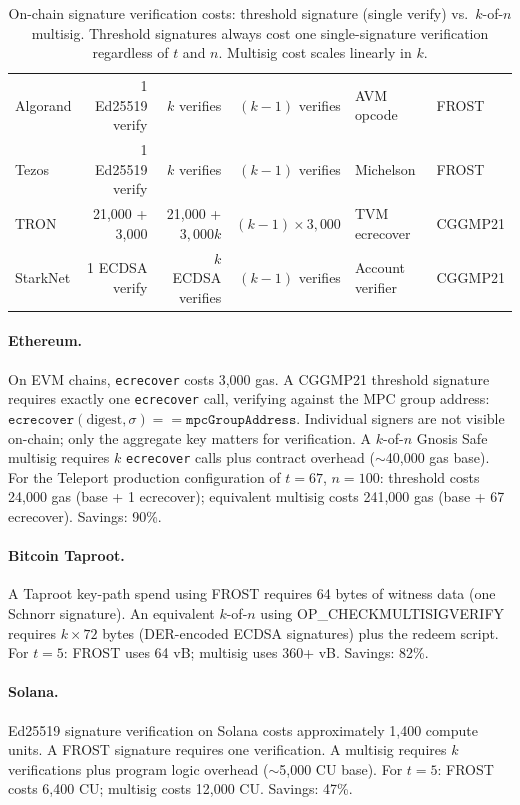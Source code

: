 \begin{table}[t]
\begin{tabular}{@{}lrrrll@{}}
Algorand & 1 Ed25519 verify & $k$ verifies & $(k{-}1)$ verifies & AVM opcode & FROST \\
Tezos & 1 Ed25519 verify & $k$ verifies & $(k{-}1)$ verifies & Michelson & FROST \\
TRON & 21,000 + 3,000 & 21,000 + $3{,}000k$ & $(k{-}1) \times 3{,}000$ & TVM ecrecover & CGGMP21 \\
StarkNet & 1 ECDSA verify & $k$ ECDSA verifies & $(k{-}1)$ verifies & Account verifier & CGGMP21 \\
\bottomrule
\end{tabular}
\caption{On-chain signature verification costs: threshold signature (single verify) vs.\ $k$-of-$n$ multisig. Threshold signatures always cost one single-signature verification regardless of $t$ and $n$. Multisig cost scales linearly in $k$.}
\label{tab:gas}
\end{table}

\paragraph{Ethereum.} On EVM chains, \texttt{ecrecover} costs 3,000 gas. A
CGGMP21 threshold signature requires exactly one \texttt{ecrecover} call, verifying
against the MPC group address: $\texttt{ecrecover}(\text{digest}, \sigma) ==
\texttt{mpcGroupAddress}$. Individual signers are not visible on-chain; only the
aggregate key matters for verification. A $k$-of-$n$ Gnosis Safe multisig requires
$k$ \texttt{ecrecover} calls plus contract overhead ($\sim$40,000 gas base). For
the Teleport production configuration of $t = 67$, $n = 100$: threshold costs
24,000 gas (base + 1 ecrecover); equivalent multisig costs 241,000 gas (base + 67
ecrecover). Savings: 90\%.

\paragraph{Bitcoin Taproot.} A Taproot key-path spend using FROST requires 64 bytes
of witness data (one Schnorr signature). An equivalent $k$-of-$n$ using
OP\_CHECKMULTISIGVERIFY requires $k \times 72$ bytes (DER-encoded ECDSA signatures)
plus the redeem script. For $t = 5$: FROST uses 64 vB; multisig uses 360+ vB.
Savings: 82\%.

\paragraph{Solana.} Ed25519 signature verification on Solana costs approximately
1,400 compute units. A FROST signature requires one verification. A multisig requires
$k$ verifications plus program logic overhead ($\sim$5,000 CU base). For $t = 5$:
FROST costs 6,400 CU; multisig costs 12,000 CU. Savings: 47\%.


